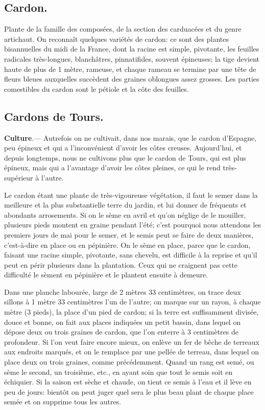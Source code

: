 \documentclass[10pt,a4paper]{book}
\begin{document}
\subsection{Cardon.}

Plante de la famille des composées, de la section des carduacées et du genre artichaut. On reconnaît quelques variétés de cardon: ce sont des plantes bisannuelles du midi de la France, dont la racine est simple, pivotante, les feuilles radicales très-longues, blanchâtres, pinnatifides, souvent épineuses; la tige devient haute de plus de 1 mètre, rameuse, et chaque rameau se termine par une tête de fleurs bleues auxquelles succèdent des graines oblongues assez grosses. Les parties comestibles du cardon sont le pétiole et la côte des feuilles.

\subsection{Cardons de Tours.}

\textbf{Culture}.--- Autrefois on ne cultivait, dans nos marais, que le cardon d'Espagne, peu épineux et qui a l'inconvénient d'avoir les côtes creuses. Aujourd'hui, et depuis longtemps, nous ne cultivons plus que le cardon de Tours, qui est plus épineux, mais qui a l'avantage d'avoir les côtes pleines, ce qui le rend très-supérieur à l'autre.

Le cardon étant une plante de très-vigoureuse végétation, il faut le semer dans la meilleure et la plus substantielle terre du jardin, et lui donner de fréquents et abondants arrosements. Si on le sème en avril et qu'on néglige de le mouiller, plusieurs pieds montent en graine pendant l'été; c'est pourquoi nous attendons les premiers jours de mai pour le semer, et le semis peut se faire de deux manières, c'est-à-dire en place ou en pépinière. On le sème en place, parce que le cardon, faisant une racine simple, pivotante, sans chevelu, est difficile à la reprise et qu'il peut en périr plusieurs dans la plantation. Ceux qui ne craignent pas cette difficulté le sèment en pépinière et le plantent ensuite à demeure.

Dans une planche labourée, large de 2 mètres 33 centimètres, on trace deux sillons à 1 mètre 33 centimètres l'un de l'autre; on marque sur un rayon, à chaque mètre (3 pieds), la place d'un pied de cardon; si la terre est suffisamment divisée, douce et bonne, on fait aux places indiquées un petit bassin, dans lequel on dépose deux ou trois graines de cardon, que l'on enterre à 3 centimètres de profondeur. Si l'on veut faire encore mieux, on enlève un fer de bêche de terreaux aux endroits marqués, et on le remplace par une pellée de terreau, dans lequel on place deux ou trois graines, comme précédemment. Quand un rang est semé, ou sème le second, un troisième, etc., en ayant soin que tout le semis soit en échiquier. Si la saison est sèche et chaude, on tient ce semis à l'eau et il lève en peu de jours: bientôt on peut juger quel sera le plus beau plant de chaque place semée et on supprime tous les autres.
\end{document}
